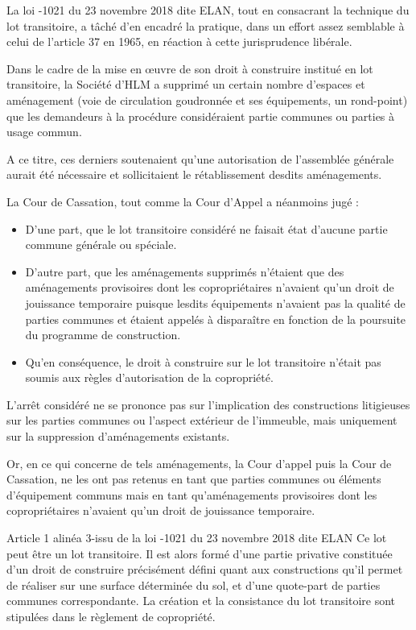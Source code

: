 			La loi -1021 du 23 novembre 2018 dite ELAN, tout en consacrant la technique du lot transitoire, a
			tâché d’en encadré la pratique, dans un effort assez semblable à celui de l’article 37 en 1965, en réaction
			à cette jurisprudence libérale.
		
			Dans le cadre de la mise en œuvre de son droit à construire institué en lot transitoire, la Société d’HLM a supprimé un certain
			nombre d’espaces et aménagement (voie de circulation goudronnée et ses équipements, un rond-point) que les demandeurs à la
			procédure considéraient partie communes ou parties à usage commun.
			
			A ce titre, ces derniers soutenaient qu’une autorisation de l’assemblée générale aurait été nécessaire et sollicitaient le
			rétablissement desdits aménagements.
			
			La Cour de Cassation, tout comme la Cour d’Appel a néanmoins jugé :
			\begin{itemize}
				\item D’une part, que le lot transitoire considéré ne faisait état d’aucune partie commune générale ou spéciale.
				\item  D’autre part, que les aménagements supprimés n’étaient que des aménagements provisoires dont les copropriétaires
				n’avaient qu’un droit de jouissance temporaire puisque lesdits équipements n’avaient pas la qualité de parties
				communes et étaient appelés à disparaître en fonction de la poursuite du programme de construction.
				\item  Qu’en conséquence, le droit à construire sur le lot transitoire n’était pas soumis aux règles d’autorisation de la
				copropriété.
			\end{itemize}
			
			L’arrêt considéré ne se prononce pas sur l’implication des constructions litigieuses sur les parties communes ou l’aspect extérieur de
			l’immeuble, mais uniquement sur la suppression d’aménagements existants.
		
			Or, en ce qui concerne de tels aménagements, la Cour d’appel puis la Cour de Cassation, ne les ont pas retenus en tant que parties
			communes ou éléments d’équipement communs mais en tant qu’aménagements provisoires dont les copropriétaires n’avaient qu’un
			droit de jouissance temporaire.
			
			Article 1 alinéa 3-issu de la loi -1021 du 23 novembre 2018 dite ELAN
			Ce lot peut être un lot transitoire. Il est alors formé d'une partie privative constituée d'un droit de
			construire précisément défini quant aux constructions qu'il permet de réaliser sur une surface
			déterminée du sol, et d'une quote-part de parties communes correspondante. La création et la
			consistance du lot transitoire sont stipulées dans le règlement de copropriété.
			
